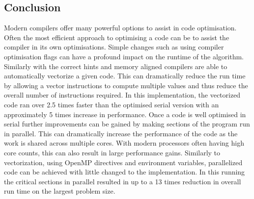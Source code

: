 \documentclass{article}
\begin{document}
\begin{multicols}{2}
\section{Conclusion}

Modern compilers offer many powerful options to assist in code optimisation.
Often the most efficient approach to optimising a code can be to assist the
compiler in its own optimisations. Simple changes such as using compiler
optimisation flags can have a profound impact on the runtime of the algorithm.
Similarly with the correct hints and memory aligned compilers are able to
automatically vectorize a given code. This can dramatically reduce the run time
by allowing a vector instructions to compute multiple values and thus reduce the
overall number of instructions required. In this implementation, the vectorized code ran
over 2.5 times faster than the optimised serial version with an approximately 5
times increase in performance. Once a code is well optimised in serial further
improvements can be gained by making sections of the program run in parallel.
This can dramatically increase the performance of the code as the work is
shared across multiple cores. With modern processors often having high core
counts, this can also result in large performance gains.  Similarly to
vectorization, using OpenMP directives and environment variables, parallelized
code can be achieved with little changed to the implementation. In this running
the critical sections in parallel resulted in up to a 13 times reduction in
overall run time on the largest problem size.





\end{multicols}
\end{document}
